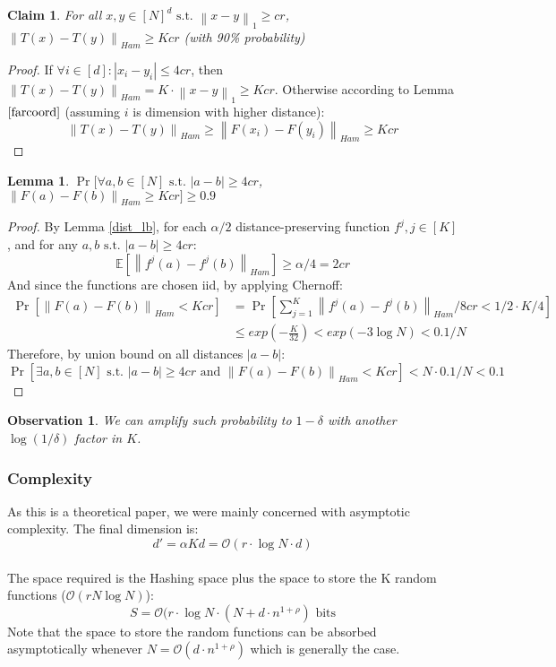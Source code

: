 \documentclass{scrartcl}
\newcommand{\st}{\text{ s.t. }}
\newcommand{\BO}{{\mathcal{O}}}
\newtheorem{lemma}[theorem]{Lemma}
\newtheorem{observation}[theorem]{Observation}
\newtheorem{claim}[theorem]{Claim}
\newcommand{\E}{{\mathbb E}}
\newcommand{\norm}[1]{\left\lVert#1\right\rVert}
\begin{document}
\begin{claim}
	For all $x,y \in [N]^d \st \norm{x-y}_1 \geq cr$, $\norm{T(x)-T(y)}_{Ham} \geq Kcr$ (with 90\% probability)
\end{claim}
\begin{proof}
If $\forall i \in [d] : |x_i-y_i|\leq 4cr$, then $\norm{T(x)-T(y)}_{Ham} = K\cdot \norm{x-y}_1 \geq Kcr$. \newline
Otherwise according to Lemma $\ref{farcoord}$ (assuming $i$ is dimension with higher distance):
$$\norm{T(x)-T(y)}_{Ham} \geq \norm{F(x_i)-F(y_i)}_{Ham} \geq Kcr$$
\end{proof}

\begin{lemma}
\label{farcoord}
	$\Pr[\forall a,b \in [N] \st |a-b|\geq 4cr$, $\norm{F(a)-F(b)}_{Ham} \geq Kcr] \geq 0.9$
\end{lemma}
\begin{proof}
By Lemma \ref{dist_lb}, for each $\alpha/2$ distance-preserving function $f^j, j \in [K]$, and for any $a,b \st |a-b| \geq 4cr$:
	$$\E[\norm{f^j(a) - f^j(b)}_{Ham}] \geq \alpha/4 = 2cr$$
	And since the functions are chosen iid, by applying Chernoff:
	\begin{align*}
	\Pr[\norm{F(a) - F(b)}_{Ham} < Kcr] &= \Pr[\sum_{j=1}^K\norm{f^j(a) - f^j(b)}_{Ham}/8cr < 1/2 \cdot K/4] \\
	&\leq exp\left(-\frac{K}{32}\right) < exp\left(-3\log N \right) < 0.1/N
	\end{align*}
	Therefore, by union bound on all distances $|a-b|$:
	$$\Pr[\exists a,b \in [N] \st |a-b|\geq 4cr \text{ and } \norm{F(a)-F(b)}_{Ham} < Kcr] < N \cdot 0.1/N < 0.1$$
\end{proof}
\begin{observation}
We can amplify such probability to $1-\delta$ with another $\log(1/\delta)$ factor in $K$.	
\end{observation}

\subsubsection{Complexity}
As this is a theoretical paper, we were mainly concerned with asymptotic complexity. The final dimension is:
$$d' = \alpha K d = \BO(r\cdot \log{N} \cdot d)$$
\paragraph{}
The space required is the Hashing space plus the space to store the K random functions ($\BO(rN\log N)$):
$$S = \BO(r\cdot \log{N} \cdot (N+ d \cdot n^{1+\rho}) \text{ bits}$$
Note that the space to store the random functions can be absorbed asymptotically whenever $N = \BO(d\cdot n^{1+\rho})$ which is generally the case.
\end{document}
